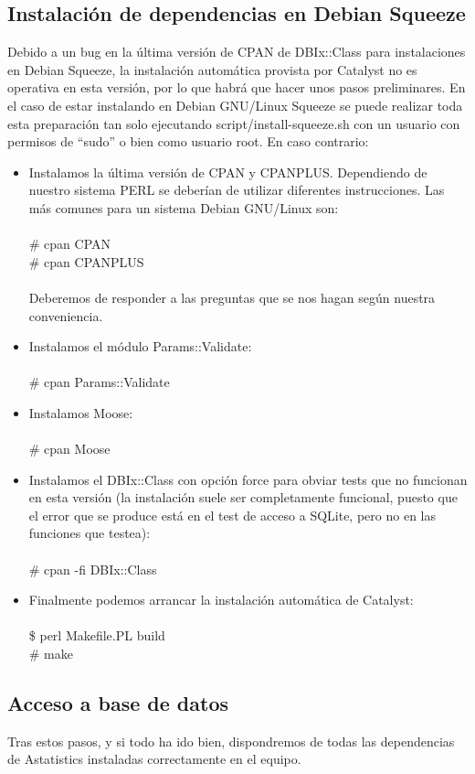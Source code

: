 \documentclass[spanish,12pt]{book}
\begin{document}
\subsection{Instalación de dependencias en Debian Squeeze}
Debido a un bug en la última versión de CPAN de DBIx::Class para instalaciones en Debian Squeeze, la instalación automática provista por Catalyst no es operativa en esta versión, por lo que habrá que hacer unos pasos preliminares. En el caso de estar instalando en Debian GNU/Linux Squeeze se puede realizar toda esta preparación tan solo ejecutando script/install-squeeze.sh con un usuario con permisos de ``sudo'' o bien como usuario root. En caso contrario:
\begin{itemize}
\item Instalamos la última versión de CPAN y CPANPLUS. Dependiendo de nuestro sistema PERL se deberían de utilizar diferentes instrucciones. Las más comunes para un sistema Debian GNU/Linux son:\\\\\# cpan CPAN\\\# cpan CPANPLUS\\\\Deberemos de responder a las preguntas que se nos hagan según nuestra conveniencia.
\item Instalamos el módulo Params::Validate:\\\\\# cpan Params::Validate
\item Instalamos Moose:\\\\\# cpan Moose
\item Instalamos el DBIx::Class con opción \-\-force para obviar tests que no funcionan en esta versión (la instalación suele ser completamente funcional, puesto que el error que se produce está en el test de acceso a SQLite, pero no en las funciones que testea):\\\\\# cpan -fi DBIx::Class
\item Finalmente podemos arrancar la instalación automática de Catalyst:\\\\\$ perl Makefile.PL build\\\# make
\end{itemize}

\subsection{Acceso a base de datos}
Tras estos pasos, y si todo ha ido bien, dispondremos de todas las dependencias de Astatistics instaladas correctamente en el equipo.
\end{document}
